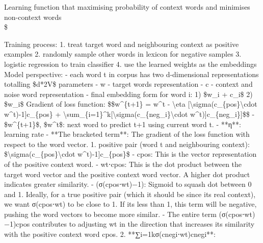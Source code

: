 \documentclass[
]{article}
\begin{document}
Learning function that maximising probability of context words and
minimises non-context words\\
\${}

Training process: 1. treat target word and neighbouring context as
positive examples 2. randomly sample other words in lexicon for negative
samples 3. logistic regression to train classifier 4. use the learned
weights as the embeddings Model perspective: - each word t in corpus has
two d-dimensional representations totalling \$d*2\textbar V\textbar\$
parameters - w - target words representation - c - context and noise
word representation - final embedding form for word i: 1) \$w\_i +
c\_i\$ 2) \$w\_i\$ Gradient of loss function: \$\$w\^{}\{t+1\} = w\^{}t
- \textbackslash eta
{[}\textbackslash sigma(c\_\{pos\}\textbackslash cdot
w\^{}t)-1{]}c\_\{pos\} +
\textbackslash sum\_\{i=1\}\^{}k{[}\textbackslash sigma(c\_\{neg\_i\}\textbackslash cdot
w\^{}t){]}c\_\{neg\_i\}{]}\$\$ - \$w\^{}\{t+1\}\$, \$w\^{}t\$: next word
to predict t+1 using current word t. - **η**: learning rate - **The
bracketed term**: The gradient of the loss function with respect to the
word vector. 1. positive pair (word t and neighbouring context):
\$\textbackslash sigma(c\_\{pos\}\textbackslash cdot
w\^{}t)-1{]}c\_\{pos\}\$ - cpos\hspace{0pt}: This is the vector
representation of the positive context word. - wt⋅cpos\hspace{0pt}: This
is the dot product between the target word vector and the positive
context word vector. A higher dot product indicates greater similarity.
- (σ(cpos\hspace{0pt}⋅wt)−1): Sigmoid to squash dot between 0 and 1.
Ideally, for a true positive pair (which it should be since its real
context), we want σ(cpos\hspace{0pt}⋅wt) to be close to 1. If
it\textquotesingle s less than 1, this term will be negative, pushing
the word vectors to become more similar. - The entire term
(σ(cpos\hspace{0pt}⋅wt)−1)cpos\hspace{0pt} contributes to adjusting wt
in the direction that increases its similarity with the positive context
word cpos\hspace{0pt}. 2.
**∑i=1k\hspace{0pt}σ(cnegi\hspace{0pt}\hspace{0pt}⋅wt)cnegi\hspace{0pt}\hspace{0pt}**:
\end{document}
